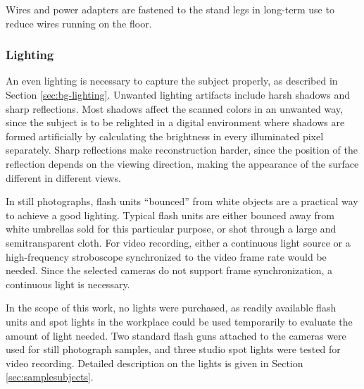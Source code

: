 Wires and power adapters are fastened to the stand legs in long-term use to reduce wires running on the floor.




\subsubsection{Lighting}

An even lighting is necessary to capture the subject properly, as described in Section \ref{sec:bg-lighting}.
Unwanted lighting artifacts include harsh shadows and sharp reflections.
Most shadows affect the scanned colors in an unwanted way, since the subject is to be relighted in a digital environment where shadows are formed artificially by calculating the brightness in every illuminated pixel separately.
Sharp reflections make reconstruction harder, since the position of the reflection depends on the viewing direction, making the appearance of the surface different in different views.

In still photographs, flash units ``bounced'' from white objects are a practical way to achieve a good lighting.
Typical flash units are either bounced away from white umbrellas sold for this particular purpose, or shot through a large and semitransparent cloth.
For video recording, either a continuous light source or a high-frequency stroboscope synchronized to the video frame rate would be needed.
Since the selected cameras do not support frame synchronization, a continuous light is necessary.

In the scope of this work, no lights were purchased, as readily available flash units and spot lights in the workplace could be used temporarily to evaluate the amount of light needed.
Two standard flash guns attached to the cameras were used for still photograph samples, and three studio spot lights were tested for video recording.
Detailed description on the lights is given in Section \ref{sec:samplesubjects}.

